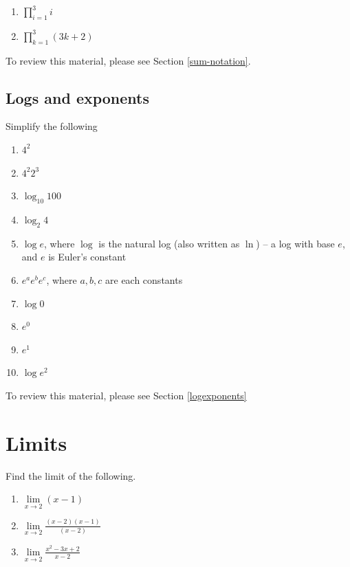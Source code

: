 \documentclass[
]{book}
\providecommand{\tightlist}{%
  \setlength{\itemsep}{0pt}\setlength{\parskip}{0pt}}
\theoremstyle{definition}
\theoremstyle{definition}
\theoremstyle{definition}
\theoremstyle{remark}
\begin{document}
\begin{enumerate}
\def\labelenumi{\arabic{enumi}.}
\item
  \(\prod\limits_{i= 1}^3 i\)
\item
  \(\prod\limits_{k=1}^3(3k + 2)\)
\end{enumerate}

To review this material, please see Section \ref{sum-notation}.

\hypertarget{logs-and-exponents}{%
\subsection*{Logs and exponents}\label{logs-and-exponents}}

Simplify the following

\begin{enumerate}
\def\labelenumi{\arabic{enumi}.}
\tightlist
\item
  \(4^2\)
\item
  \(4^2 2^3\)
\item
  \(\log_{10}100\)
\item
  \(\log_{2}4\)
\item
  \(\log e\), where \(\log\) is the natural log (also written as \(\ln\)) -- a log with base \(e\), and \(e\) is Euler's constant
\item
  \(e^a e^b e^c\), where \(a, b, c\) are each constants
\item
  \(\log 0\)
\item
  \(e^0\)
\item
  \(e^1\)
\item
  \(\log e^2\)
\end{enumerate}

To review this material, please see Section \ref{logexponents}

\hypertarget{limits}{%
\section*{Limits}\label{limits}}

Find the limit of the following.

\begin{enumerate}
\def\labelenumi{\arabic{enumi}.}
\tightlist
\item
  \(\lim\limits_{x \to 2} (x - 1)\)
\item
  \(\lim\limits_{x \to 2} \frac{(x - 2) (x - 1)}{(x - 2)}\)
\item
  \(\lim\limits_{x \to 2}\frac{x^2 - 3x + 2}{x- 2}\)
\end{enumerate}
\end{document}
